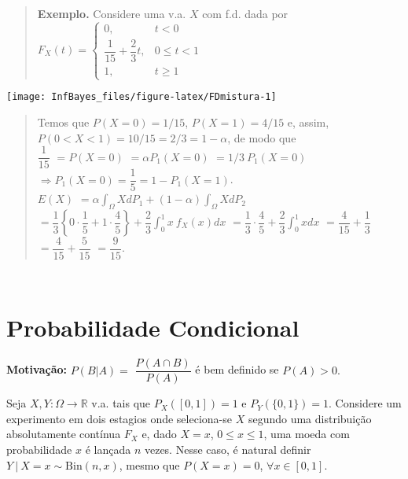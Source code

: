 \documentclass[
]{book}
\begin{document}
\begin{quote}
\textbf{Exemplo.} Considere uma v.a. \(X\) com f.d. dada por\\
\(F_X(t)=\left\{\begin{array}{ll} 0, & t<0\\ \dfrac{1}{15}+\dfrac{2}{3}t, & 0\leq t < 1\\ 1, & t \geq 1\end{array}\right.\)
\end{quote}

\begin{center}\texttt{[image: InfBayes\_files/figure-latex/FDmistura-1]} \end{center}

\begin{quote}
Temos que \(P(X=0)=1/15\), \(P(X=1)=4/15\) e, assim, \(P(0<X<1)=10/15=2/3=1-\alpha\), de modo que\\
\(\dfrac{1}{15}\) \(=P(X=0)\) \(=\alpha P_1(X=0)\) \(=1/3~P_1(X=0)\)
\(\Rightarrow P_1(X=0)=\dfrac{1}{5} = 1-P_1(X=1)\).\\
\(E(X)\) \(=\displaystyle\alpha\int_\Omega XdP_1+(1-\alpha)\int_\Omega X dP_2\) \(=\displaystyle\dfrac{1}{3}\left\{0\cdot\dfrac{1}{5}+1\cdot\dfrac{4}{5}\right\}+\dfrac{2}{3}\int_{0}^{1} x~f_X(x)dx\) \(=\displaystyle\dfrac{1}{3}\cdot\dfrac{4}{5}+\dfrac{2}{3}\int_0^1 xdx\) \(=\dfrac{4}{15}+\dfrac{1}{3}\) \(=\dfrac{4}{15}+\dfrac{5}{15}\) \(=\dfrac{9}{15}\).
\end{quote}

\(~\)

\(~\)

\hypertarget{probabilidade-condicional}{%
\section{Probabilidade Condicional}\label{probabilidade-condicional}}

\textbf{Motivação:} \(P(B|A)=\) \(\dfrac{P(A\cap B)}{P(A)}\) é bem definido se \(P(A)>0.\)

Seja \(X,Y: \Omega \longrightarrow \mathbb{R}\) v.a. tais que \(P_X\left([0,1]\right)=1\) e \(P_Y\left(\{0,1\}\right)=1\). Considere um experimento em dois estagios onde seleciona-se \(X\) segundo uma distribuição absolutamente contínua \(F_X\) e, dado \(X=x\), \(0\leq x\leq 1\), uma moeda com probabilidade \(x\) é lançada \(n\) vezes. Nesse caso, é natural definir \(Y~\big|~X=x\sim \text{Bin}(n,x)\), mesmo que \(P(X=x)=0\), \(\forall x \in [0,1]\).
\end{document}
